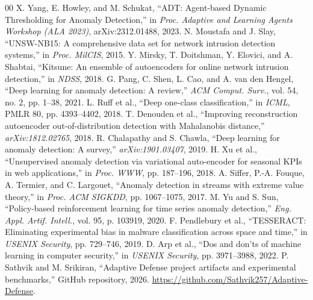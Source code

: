 \documentclass[conference]{IEEEtran}
\begin{document}
\begin{thebibliography}{00}
 X. Yang, E. Howley, and M. Schukat, ``ADT: Agent-based Dynamic Thresholding for Anomaly Detection,'' in \textit{Proc. Adaptive and Learning Agents Workshop (ALA 2023)}, arXiv:2312.01488, 2023.
 N. Moustafa and J. Slay, ``UNSW-NB15: A comprehensive data set for network intrusion detection systems,'' in \textit{Proc. MilCIS}, 2015.
 Y. Mirsky, T. Doitshman, Y. Elovici, and A. Shabtai, ``Kitsune: An ensemble of autoencoders for online network intrusion detection,'' in \textit{NDSS}, 2018.
 G. Pang, C. Shen, L. Cao, and A. van den Hengel, ``Deep learning for anomaly detection: A review,'' \textit{ACM Comput. Surv.}, vol. 54, no. 2, pp. 1--38, 2021.
 L. Ruff et al., ``Deep one-class classification,'' in \textit{ICML}, PMLR 80, pp. 4393--4402, 2018.
 T. Denouden et al., ``Improving reconstruction autoencoder out-of-distribution detection with Mahalanobis distance,'' \textit{arXiv:1812.02765}, 2018.
 R. Chalapathy and S. Chawla, ``Deep learning for anomaly detection: A survey,'' \textit{arXiv:1901.03407}, 2019.
 H. Xu et al., ``Unsupervised anomaly detection via variational auto-encoder for seasonal KPIs in web applications,'' in \textit{Proc. WWW}, pp. 187--196, 2018.
 A. Siffer, P.-A. Fouque, A. Termier, and C. Largouet, ``Anomaly detection in streams with extreme value theory,'' in \textit{Proc. ACM SIGKDD}, pp. 1067--1075, 2017.
 M. Yu and S. Sun, ``Policy-based reinforcement learning for time series anomaly detection,'' \textit{Eng. Appl. Artif. Intell.}, vol. 95, p. 103919, 2020.
 F. Pendlebury et al., ``TESSERACT: Eliminating experimental bias in malware classification across space and time,'' in \textit{USENIX Security}, pp. 729--746, 2019.
 D. Arp et al., ``Dos and don'ts of machine learning in computer security,'' in \textit{USENIX Security}, pp. 3971--3988, 2022.
 P. Sathvik and M. Srikiran, ``Adaptive Defense project artifacts and experimental benchmarks,'' GitHub repository, 2026. \url{https://github.com/Sathvik257/Adaptive-Defense}.
\end{thebibliography}
\end{document}
